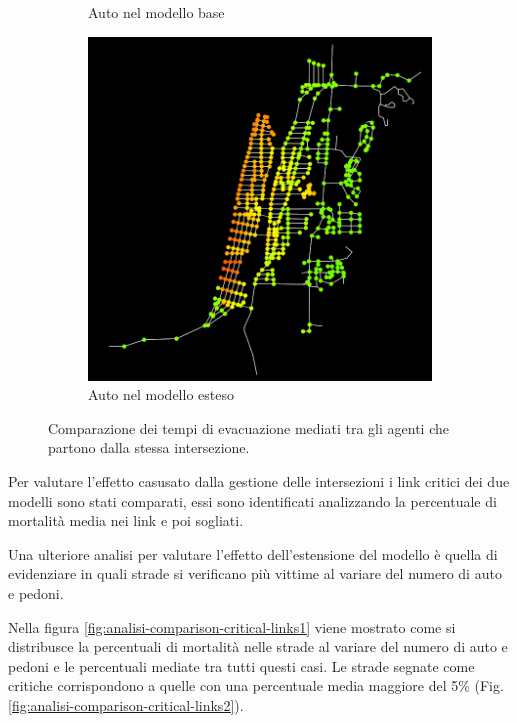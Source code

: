 \begin{figure}[ht]
\begin{subfigure}{0.475\textwidth}
        \caption{Auto nel modello base}
        \label{fig:2d-evtimes-base-car}
    \end{subfigure}
    \hfill
    \begin{subfigure}{0.475\textwidth}
        \centering
        \includegraphics[width=\textwidth]{images/analisi/comparison-ev-times-map-new-car.png}
        \caption{Auto nel modello esteso}
        \label{fig:2d-evtimes-new-car}
    \end{subfigure}
    \caption{Comparazione dei tempi di evacuazione mediati tra gli agenti che partono dalla stessa intersezione. }
    \label{fig:analisi-comparison-ev-times-map}
\end{figure}

Per valutare l'effetto casusato dalla gestione delle intersezioni i link critici dei due modelli sono stati comparati,
essi sono identificati analizzando la percentuale di mortalità media nei link e poi sogliati.

Una ulteriore analisi per valutare l'effetto dell'estensione del modello è quella di evidenziare in quali strade si verificano 
più vittime al variare del numero di auto e pedoni. 

Nella figura \ref{fig:analisi-comparison-critical-links1} viene mostrato come si distribusce la percentuali di mortalità nelle strade 
al variare del numero di auto e pedoni e le percentuali mediate tra tutti questi casi. 
Le strade segnate come critiche corrispondono a quelle con una percentuale media maggiore del 5\% (Fig. \ref{fig:analisi-comparison-critical-links2}).


